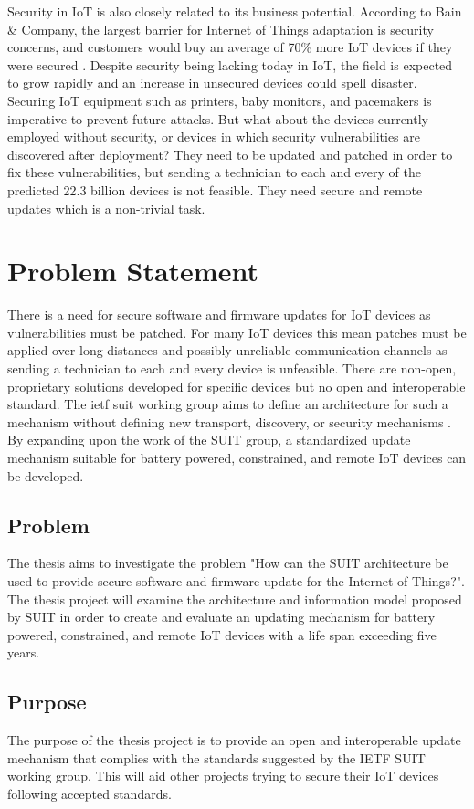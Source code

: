 \documentclass[0-thesis.tex]{subfiles}
\begin{document}
Security in IoT is also closely related to its business potential. According to Bain \&
Company, the largest barrier for Internet of Things adaptation is security concerns, and
customers would buy an average of 70\% more IoT devices if they were secured
\parencite{ali_bosche_ford_2018}. Despite security being lacking today in IoT, the field
is expected to grow rapidly and an increase in unsecured devices could spell disaster.
Securing IoT equipment such as printers, baby monitors, and pacemakers is imperative to
prevent future attacks. But what about the devices currently employed without security, or
devices in which security vulnerabilities are discovered after deployment? They need to be
updated and patched in order to fix these vulnerabilities, but sending a technician to
each and every of the predicted 22.3 billion devices is not feasible. They need secure and
remote updates which is a non-trivial task.

\section{Problem Statement}
There is a need for secure software and firmware updates for IoT devices as
vulnerabilities must be patched. For many IoT devices this mean patches must be applied
over long distances and possibly unreliable communication channels as sending a technician
to each and every device is unfeasible. There are non-open, proprietary solutions
developed for specific devices but no open and interoperable standard. The \gls{ietf}
\gls{suit} working group aims to define an architecture for such a mechanism without
defining new transport, discovery, or security mechanisms \parencite{suit}. By expanding
upon the work of the SUIT group, a standardized update mechanism suitable for battery
powered, constrained, and remote IoT devices can be developed.

\subsection{Problem}
The thesis aims to investigate the problem "How can the SUIT architecture be used to
provide secure software and firmware update for the Internet of Things?". The thesis
project will examine the architecture and information model proposed by SUIT in order to
create and evaluate an updating mechanism for battery powered, constrained, and remote IoT
devices with a life span exceeding five years. 

\subsection{Purpose}
The purpose of the thesis project is to provide an open and interoperable update mechanism
that complies with the standards suggested by the IETF SUIT working group. This will aid
other projects trying to secure their IoT devices following accepted standards.
\end{document}
